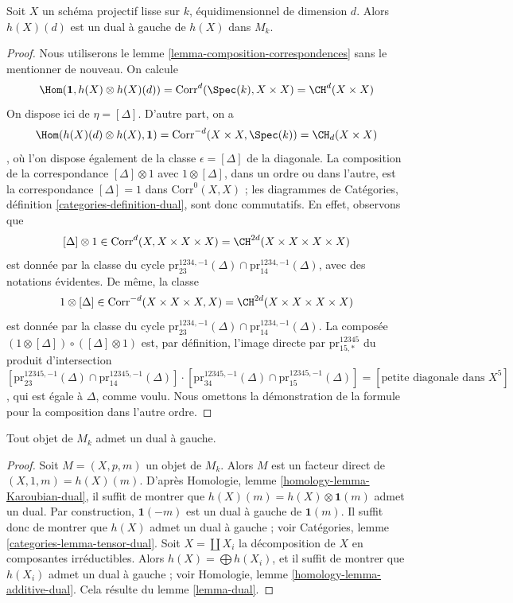 \begin{lemma}
\label{lemma-dual}
Soit $X$ un schéma projectif lisse sur $k$, équidimensionnel
de dimension $d$. Alors $h(X)(d)$ est un dual à gauche de $h(X)$ dans $M_k$.
\end{lemma}

\begin{proof}
Nous utiliserons le lemme \ref{lemma-composition-correspondences}
sans le mentionner de nouveau. On calcule
$$
\Hom(\mathbf{1}, h(X) \otimes h(X)(d)) =
\text{Corr}^d(\Spec(k), X \times X) = \CH^d(X \times X)
$$
On dispose ici de $\eta = [\Delta]$. D'autre part, on a
$$
\Hom(h(X)(d) \otimes h(X), \mathbf{1}) =
\text{Corr}^{-d}(X \times X, \Spec(k)) = \CH_d(X \times X)
$$,
où l'on dispose également de la classe $\epsilon = [\Delta]$
de la diagonale. La composition de la correspondance
$[\Delta] \otimes 1$ avec $1 \otimes [\Delta]$, dans un ordre ou dans l'autre,
est la correspondance $[\Delta] = 1$ dans $\text{Corr}^0(X, X)$ ; les diagrammes de
Catégories, définition \ref{categories-definition-dual},
sont donc commutatifs.
En effet, observons que
$$
[\Delta] \otimes 1 \in \text{Corr}^d(X, X \times X \times X) =
\CH^{2d}(X \times X \times X \times X)
$$
est donnée par la classe du cycle
$\text{pr}^{1234, -1}_{23}(\Delta) \cap \text{pr}^{1234, -1}_{14}(\Delta)$, avec
des notations évidentes. De même, la classe
$$
1 \otimes [\Delta] \in \text{Corr}^{-d}(X \times X \times X, X) =
\CH^{2d}(X \times X \times X \times X)
$$
est donnée par la classe du cycle
$\text{pr}^{1234, -1}_{23}(\Delta) \cap \text{pr}^{1234, -1}_{14}(\Delta)$.
La composée $(1 \otimes [\Delta]) \circ ([\Delta] \otimes 1)$
est, par définition, l'image directe par $\text{pr}^{12345}_{15, *}$
du produit d'intersection
$$
[\text{pr}^{12345, -1}_{23}(\Delta) \cap \text{pr}^{12345, -1}_{14}(\Delta)]
\cdot
[\text{pr}^{12345, -1}_{34}(\Delta) \cap \text{pr}^{12345, -1}_{15}(\Delta)]
=
[\text{petite diagonale dans } X^5]
$$,
qui est égale à $\Delta$, comme voulu. Nous omettons la démonstration
de la formule pour la composition dans l'autre ordre.
\end{proof}

\begin{lemma}
\label{lemma-dual-general}
Tout objet de $M_k$ admet un dual à gauche.
\end{lemma}

\begin{proof}
Soit $M = (X, p, m)$ un objet de $M_k$. Alors $M$ est un facteur direct de
$(X, 1, m) = h(X)(m)$.
D'après Homologie, lemme \ref{homology-lemma-Karoubian-dual},
il suffit de montrer que
$h(X)(m) = h(X) \otimes \mathbf{1}(m)$ admet un dual.
Par construction, $\mathbf{1}(-m)$ est un dual à gauche de $\mathbf{1}(m)$.
Il suffit donc de montrer que $h(X)$ admet un dual à gauche ; voir
Catégories, lemme \ref{categories-lemma-tensor-dual}.
Soit $X = \coprod X_i$ la décomposition de $X$ en
composantes irréductibles. Alors $h(X) = \bigoplus h(X_i)$,
et il suffit de montrer que $h(X_i)$ admet un dual à gauche ; voir
Homologie, lemme \ref{homology-lemma-additive-dual}.
Cela résulte du lemme \ref{lemma-dual}.
\end{proof}







